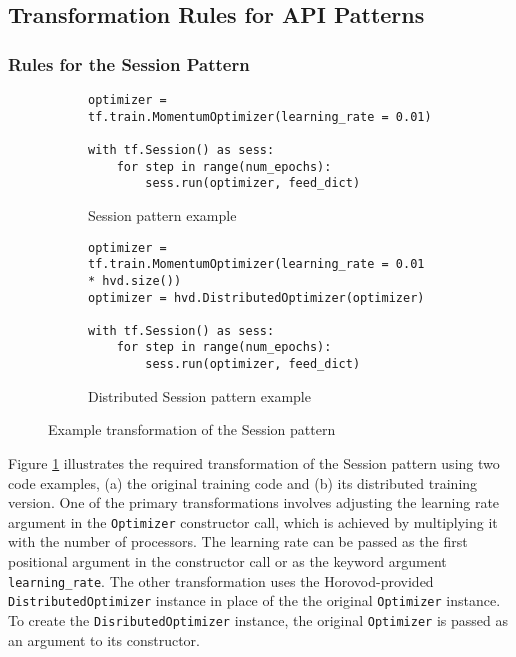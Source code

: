 \subsection{Transformation Rules for API Patterns}


\subsubsection{Rules for the Session Pattern}

\begin{figure}[ht!]
  \begin{subfigure}[t]{0.45\textwidth}
    \begin{lstlisting}[style=mpython]
optimizer = tf.train.MomentumOptimizer(learning_rate = 0.01)

with tf.Session() as sess:
    for step in range(num_epochs): 
        sess.run(optimizer, feed_dict)\end{lstlisting}
    \caption{Session pattern example}
  \end{subfigure}
  \hspace{5mm}
  \begin{subfigure}[t]{0.45\textwidth}
    \begin{lstlisting}[style=mpython]
optimizer = tf.train.MomentumOptimizer(learning_rate = 0.01 * hvd.size())
optimizer = hvd.DistributedOptimizer(optimizer)

with tf.Session() as sess:
    for step in range(num_epochs): 
        sess.run(optimizer, feed_dict)\end{lstlisting}
    \caption{Distributed Session pattern example}
  \end{subfigure}
  \caption{Example transformation of the Session pattern}
  \label{fig:trans:sessiontrans}
\end{figure}

Figure \ref{fig:trans:sessiontrans} illustrates the required transformation of
the Session pattern using two code examples, (a) the original training code and
(b) its distributed training version.
One of the primary transformations involves adjusting the learning rate
argument in the {\tt Optimizer} constructor call, which is achieved by
multiplying it with the number of processors.
The learning rate can be passed as the first positional argument in the
constructor call or as the keyword argument {\tt learning\_rate}.
The other transformation uses the Horovod-provided {\tt DistributedOptimizer}
instance in place of the the original {\tt Optimizer} instance. 
To create the {\tt DisributedOptimizer} instance, the original {\tt Optimizer}
is passed as an argument to its constructor.

